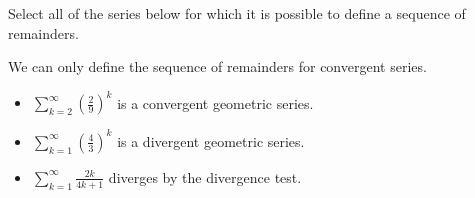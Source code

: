 \documentclass{ximera}
\begin{document}
\begin{question}
Select all of the series below for which it is possible to define a sequence of remainders.

\begin{selectAll}
\end{selectAll}

\begin{feedback}
We can only define the sequence of remainders for convergent series.

\begin{itemize}
\item $\sum_{k=2}^{\infty} \left(\frac{2}{9}\right)^k$ is a convergent geometric series.
\item $\sum_{k=1}^{\infty} \left(\frac{4}{3}\right)^k$ is a divergent geometric series.
\item $\sum_{k=1}^{\infty} \frac{2k}{4k+1}$ diverges by the divergence test.
\end{itemize}
\end{feedback}

\end{question}
\end{document}
